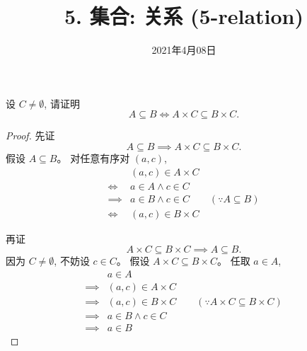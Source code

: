 \documentclass[a4paper, justified]{tufte-handout}
\title{5. 集合: 关系 (5-relation)}
\date{2021年4月08日}
\begin{document}
\maketitle
\noplagiarism %
\begin{abstract}
\end{abstract}
\beginrequired

\begin{problem}
  设 $C \neq \emptyset$, 请证明
  \[
    A \subseteq B \iff A \times C \subseteq B \times C.
  \]
\end{problem}

\begin{proof}
  先证
  \[
    A \subseteq B \implies A \times C \subseteq B \times C.
  \]
  假设 $A \subseteq B$。
  对任意有序对 $(a, c)$,
  \begin{align}
    & (a, c) \in A \times C \\[6pt]
    \iff & a \in A \land c \in C \\[6pt]
    \implies & a \in B \land c \in C \qquad (\because A \subseteq B)\\[6pt]
    \iff & (a, c) \in B \times C
  \end{align}

  再证
  \[
    A \times C \subseteq B \times C \implies A \subseteq B.
  \]
  因为 $C \neq \emptyset$, 不妨设 $c \in C$。
  假设 $A \times C \subseteq B \times C$。
  任取 $a \in A$,
  \setcounter{equation}{0}
  \begin{align}
    & a \in A \\[6pt]
    \implies &(a, c) \in A \times C \\[6pt]
    \implies &(a, c) \in B \times C
      \qquad (\because A \times C \subseteq B \times C) \\[6pt]
    \implies & a \in B \land c \in C \\[6pt]
    \implies &a \in B
  \end{align}
\end{proof}
\end{document}
